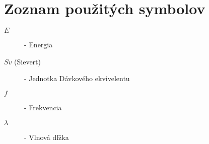 \documentclass[../main.tex]{subfiles} %
\begin{document}
%
\section*{Zoznam použitých symbolov}
\begin{multicols}{2}
\begin{description}
\item[$E$] - Energia
\item[$Sv$ (Sievert)] - Jednotka Dávkového ekvivelentu
\item[$f$] -  Frekvencia
\item [$\lambda$] - Vlnová dľžka
\end{description}
\end{multicols}
\end{document}
